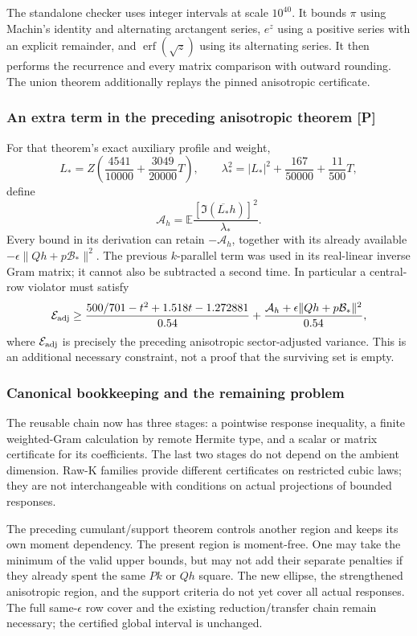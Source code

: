 The standalone checker uses integer intervals at scale $10^{40}$.
It bounds $\pi$ using Machin's identity and alternating arctangent series,
$e^z$ using a positive series with an explicit remainder, and
$\operatorname{erf}(\sqrt z)$ using its alternating series. It then
performs the recurrence and every matrix comparison with outward rounding.
The union theorem additionally replays the pinned anisotropic certificate.

\subsubsection{An extra term in the preceding anisotropic theorem [P]}
For that theorem's exact auxiliary profile and weight,
\[
 L_*=Z\left(\frac{4541}{10000}+\frac{3049}{20000}T\right),\qquad
 \lambda_*^2=|L_*|^2+\frac{167}{50000}+\frac{11}{500}T,
\]
define
\[
 \mathcal A_h=\mathbb E\frac{[\Im(\overline{L_*}h)]^2}{\lambda_*}.
\]
Every bound in its derivation can retain $-\mathcal A_h$, together with
its already available $-\epsilon\|Qh+p\mathcal B_*\|^2$.
The previous $k$-parallel term was used in its real-linear inverse Gram
matrix; it cannot also be subtracted a second time.
In particular a central-row violator must satisfy
\[
 \mathcal E_{\rm adj}\ge
 \frac{500/701-t^2+1.518t-1.272881}{0.54}
       +\frac{\mathcal A_h+\epsilon\|Qh+p\mathcal B_*\|^2}{0.54},
\]
where $\mathcal E_{\rm adj}$ is precisely the preceding anisotropic
sector-adjusted variance. This is an additional necessary constraint,
not a proof that the surviving set is empty.

\subsubsection{Canonical bookkeeping and the remaining problem}
The reusable chain now has three stages: a pointwise response inequality,
a finite weighted-Gram calculation by remote Hermite type, and a scalar
or matrix certificate for its coefficients. The last two stages do not
depend on the ambient dimension. Raw-K families provide different
certificates on restricted cubic laws; they are not interchangeable with
conditions on actual projections of bounded responses.

The preceding cumulant/support theorem controls another region and keeps
its own moment dependency. The present region is moment-free. One may
take the minimum of the valid upper bounds, but may not add their separate
penalties if they already spent the same $Pk$ or $Qh$ square.
The new ellipse, the strengthened anisotropic region, and the support
criteria do not yet cover all actual responses. The full same-$\epsilon$
row cover and the existing reduction/transfer chain remain necessary;
the certified global interval is unchanged.
